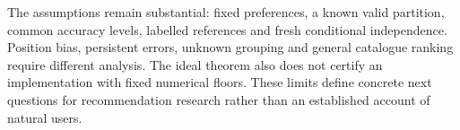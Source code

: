\documentclass[sigconf,anonymous,review]{acmart}
\begin{document}
The assumptions remain substantial: fixed preferences, a known valid partition, common accuracy levels, labelled references and fresh conditional independence. Position bias, persistent errors, unknown grouping and general catalogue ranking require different analysis. The ideal theorem also does not certify an implementation with fixed numerical floors. These limits define concrete next questions for recommendation research rather than an established account of natural users.



\end{document}
